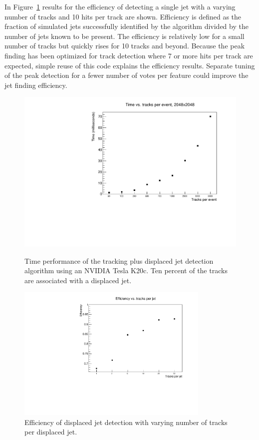 \documentclass{JINST}
\begin{document}
In Figure~\ref{fig:eff_num_tracks_per_singularity} results for the efficiency of detecting a single jet with a varying number of tracks and 10 hits per track are shown.  Efficiency is defined as the fraction of simulated jets successfully identified by the algorithm divided by the number of jets known to be present.  The efficiency is relatively low for a small number of tracks but quickly rises for 10 tracks and beyond.  Because the peak finding has been optimized for track detection where 7 or more hits per track are expected, simple reuse of this code explains the efficiency results.  Separate tuning of the peak detection for a fewer number of votes per feature could improve the jet finding efficiency.
%
\begin{figure}[!Hhtb]
\begin{minipage}[t]{8cm}
\begin{center}
\includegraphics[width=0.8 \textwidth]{figs/performance.pdf}
 \caption{Time performance of the tracking plus displaced jet detection algorithm using an NVIDIA Tesla K20c.  
          Ten percent of the tracks are associated with a displaced jet. \label{fig:performance}}
\end{center}
\end{minipage}\quad
\begin{minipage}[t]{8cm}
\begin{center}
\includegraphics[width=0.82\textwidth]{figs/eff_num_tracks_per_singularity.pdf} 
\caption{Efficiency of displaced jet detection with varying number of tracks per displaced jet.\label{fig:eff_num_tracks_per_singularity}}
\end{center}
\end{minipage}
\end{figure}
\end{document}

